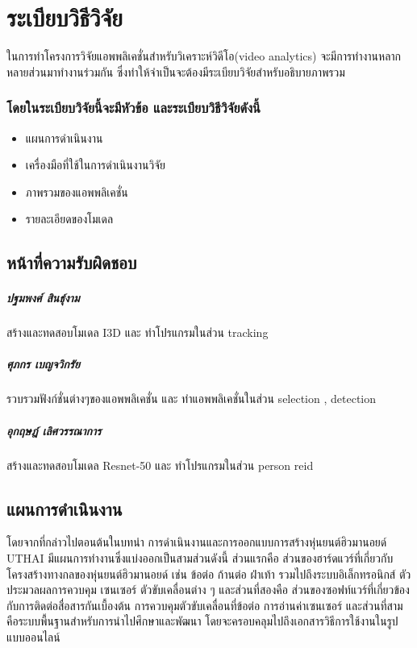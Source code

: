 \chapter{ระเบียบวิธีวิจัย}
ในการทําโครงการวิจัยแอพพลิเคชั่นสำหรับวิเคราะห์วิดีโอ(video analytics) จะมีการทำงานหลากหลายส่วนมาทำงานร่วมกัน ซึ่งทำให้จำเป็นจะต้องมีระเบียบวิจัยสำหรับอธิบายภาพรวม
\subsection*{โดยในระเบียบวิจัยนี้จะมีหัวข้อ และระเบียบวิธีวิจัยดังนี้}
\begin{itemize}\setlength\itemsep{-0.3em}
	\item แผนการดำเนินงาน
	\item เครื่องมือที่ใช้ในการดำเนินงานวิจัย
	\item ภาพรวมของแอพพลิเคชั่น
	\item รายละเอียดของโมเดล
\end{itemize}
\vspace{3mm}
\section{หน้าที่ความรับผิดชอบ} 
\paragraph*{ปฐมพงศ์ สินธุ์งาม}
สร้างและทดสอบโมเดล I3D และ ทำโปรแกรมในส่วน tracking
\paragraph*{ศุภกร เบญจวิกรัย}
รวบรวมฟังก์ชั่นต่างๆของแอพพลิเคชั่น และ ทำแอพพลิเคชั่นในส่วน selection , detection
\paragraph*{อุกฤษฎ์ เลิศวรรณาการ}
สร้างและทดสอบโมเดล Resnet-50 และ ทำโปรแกรมในส่วน person reid 

\vspace{3mm}
\section{แผนการดำเนินงาน}
โดยจากที่กล่าวไปตอนต้นในบทนำ
การดำเนินงานและการออกแบบการสร้างหุ่นยนต์ฮิวมานอยด์ UTHAI มีแผนการทำงานซึ่งแบ่งออกเป็นสามส่วนดังนี้
ส่วนแรกคือ ส่วนของฮาร์ดแวร์ที่เกี่ยวกับโครงสร้างทางกลของหุ่นยนต์ฮิวมานอยด์ เช่น ข้อต่อ ก้านต่อ ฝ่าเท้า
รวมไปถึงระบบอิเล็กทรอนิกส์ ตัวประมวลผลการควบคุม เซนเซอร์ ตัวขับเคลื่อนต่าง ๆ และส่วนที่สองคือ
ส่วนของซอฟท์แวร์ที่เกี่ยวข้องกับการติดต่อสื่อสารกันเบื้องต้น การควบคุมตัวขับเคลื่อนที่ข้อต่อ การอ่านค่าเซนเซอร์
และส่วนที่สาม คือระบบพื้นฐานสำหรับการนำไปศึกษาและพัฒนา โดยจะครอบคลุมไปถึงเอกสารวิธีการใช้งานในรูปแบบออนไลน์

